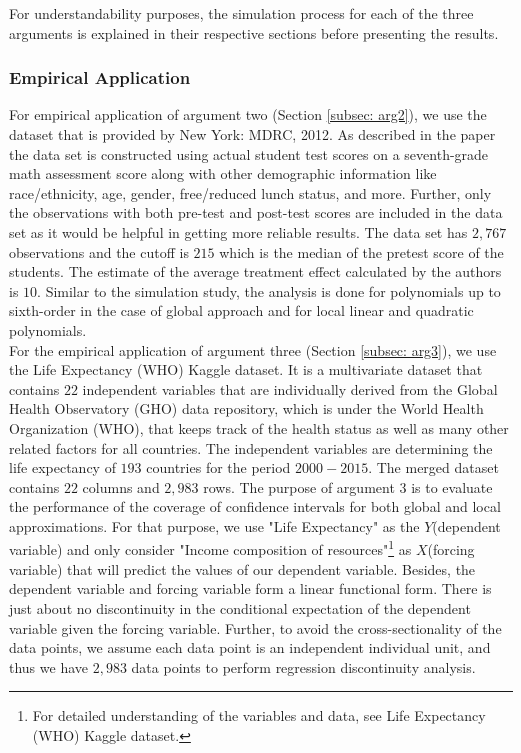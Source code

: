 \documentclass[fleqn]{article}
\begin{document}
    For understandability purposes, the simulation process for each of the three arguments is explained in their respective sections before presenting the results.\\
    
    \subsubsection{Empirical Application}
    \label{subsec: empirical application}

    For empirical application of argument two (Section \ref{subsec: arg2}), we use the dataset that is provided by New York: MDRC, 2012\cite{jacob2012practical}. As described in the paper\cite{jacob2012practical} the data set is constructed using actual student test scores on a seventh-grade math assessment score along with other demographic information like race/ethnicity, age, gender, free/reduced lunch status, and more. Further, only the observations with both pre-test and post-test scores are included in the data set as it would be helpful in getting more reliable results. The data set has $2,767$ observations and the cutoff is $215$ which is the median of the pretest score of the students. The estimate of the average treatment effect calculated by the authors is $10$. Similar to the simulation study, the analysis is done for polynomials up to sixth-order in the case of global approach and for local linear and quadratic polynomials.\\

    For the empirical application of argument three (Section \ref{subsec: arg3}), we use the Life Expectancy (WHO) Kaggle dataset\cite{kumar2018life}. It is a multivariate dataset that contains $22$ independent variables that are individually derived from the Global Health Observatory (GHO) data repository, which is under the World Health Organization (WHO), that keeps track of the health status as well as many other related factors for all countries. The independent variables are determining the life expectancy of $193$ countries for the period $2000-2015$. The merged dataset contains $22$ columns and $2,983$ rows. The purpose of argument 3 is to evaluate the performance of the coverage of confidence intervals for both global and local approximations. For that purpose, we use "Life Expectancy" as the $Y$(dependent variable) and only consider "Income composition of resources"\footnote{For detailed understanding of the variables and data, see Life Expectancy (WHO) Kaggle dataset\cite{kumar2018life}.} as $X$(forcing variable) that will predict the values of our dependent variable. Besides, the dependent variable and forcing variable form a linear functional form. There is just about no discontinuity in the conditional expectation of the dependent variable given the forcing variable. Further, to avoid the cross-sectionality of the data points, we assume each data point is an independent individual unit, and thus we have $2,983$ data points to perform regression discontinuity analysis.
\end{document}
